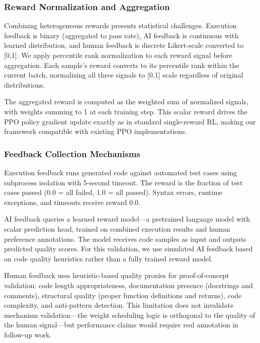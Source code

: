\subsubsection{Reward Normalization and Aggregation}

Combining heterogeneous rewards presents statistical challenges. Execution feedback is binary (aggregated to pass rate), AI feedback is continuous with learned distribution, and human feedback is discrete Likert-scale converted to [0,1]. We apply percentile rank normalization to each reward signal before aggregation. Each sample's reward converts to its percentile rank within the current batch, normalizing all three signals to [0,1] scale regardless of original distributions.

The aggregated reward is computed as the weighted sum of normalized signals, with weights summing to 1 at each training step. This scalar reward drives the PPO policy gradient update exactly as in standard single-reward RL, making our framework compatible with existing PPO implementations.

\subsubsection{Feedback Collection Mechanisms}

Execution feedback runs generated code against automated test cases using subprocess isolation with 5-second timeout. The reward is the fraction of test cases passed (0.0 = all failed, 1.0 = all passed). Syntax errors, runtime exceptions, and timeouts receive reward 0.0.

AI feedback queries a learned reward model---a pretrained language model with scalar prediction head, trained on combined execution results and human preference annotations. The model receives code samples as input and outputs predicted quality scores. For this validation, we use simulated AI feedback based on code quality heuristics rather than a fully trained reward model.

Human feedback uses heuristic-based quality proxies for proof-of-concept validation: code length appropriateness, documentation presence (docstrings and comments), structural quality (proper function definitions and returns), code complexity, and anti-pattern detection. This limitation does not invalidate mechanism validation---the weight scheduling logic is orthogonal to the quality of the human signal---but performance claims would require real annotation in follow-up work.

